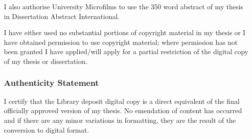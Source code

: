 {I also authorise University Microfilms to use the 350 word abstract of my thesis
in Dissertation Abstract International.

I have either used no substantial portions of copyright material in my thesis or
I have obtained permission to use copyright material; where permission has not
been granted I have applied/will apply for a partial restriction of the digital
copy of my thesis or dissertation.

\vspace{5mm}
\noindent{}


\cleardoublepage
\vspace*{1in}
\subsubsection*{Authenticity Statement}

I certify that the Library deposit digital copy is a direct equivalent
of the final officially approved version of my thesis. No emendation of content
has occurred and if there are any minor variations in formatting, they are the
result of the conversion to digital format.

\vspace{5mm}
\noindent{}

} %

